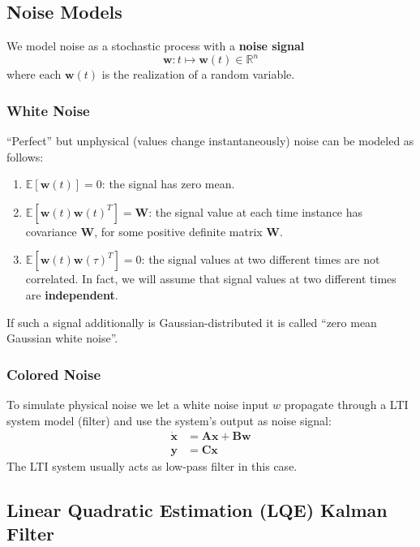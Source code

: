 \subsection{Noise Models}
We model noise as a stochastic process with a \textbf{noise signal}
\begin{equation*}
    \mathbf{w}:t\mapsto \mathbf{w}(t)\in\mathbb{R}^n
\end{equation*}
where each $\mathbf{w}(t)$ is the realization of a random variable.

\subsubsection{White Noise}
``Perfect'' but unphysical (values change instantaneously) noise can be modeled as follows:
\begin{enumerate}
    \item $\mathbb{E}[\mathbf{w}(t)]=0$:\newline
          the signal has zero mean.
    \item $\mathbb{E}[\mathbf{w}(t){\mathbf{w}(t)}^T]=\mathbf{W}$:\newline
          the signal value at each time instance has covariance $\mathbf{W}$, for some positive definite matrix $\mathbf{W}$.
    \item $\mathbb{E}[\mathbf{w}(t){\mathbf{w}(\tau)}^T]=0$:\newline
          the signal values at two different times are not correlated. In fact, we will assume that signal values at two different times are \textbf{independent}.
\end{enumerate}
If such a signal additionally is Gaussian-distributed it is called ``zero mean Gaussian white noise''.

\subsubsection{Colored Noise}
To simulate physical noise we let a white noise input $w$ propagate through a LTI system model (filter) and use the system's output as noise signal:
\begin{align*}
    \dot{\mathbf{x}} & =\mathbf{Ax}+\mathbf{Bw} \\
    \mathbf{ y}      & = \mathbf{Cx}
\end{align*}
The LTI system usually acts as low-pass filter in this case.


\subsection{Linear Quadratic Estimation (LQE) Kalman Filter}

